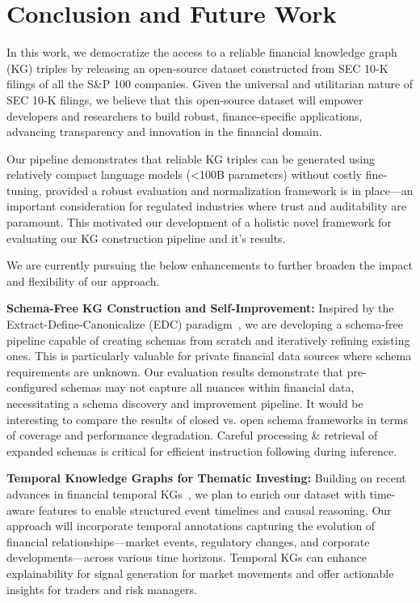 \section{Conclusion and Future Work}
In this work, we democratize the access to a reliable financial knowledge graph (KG) triples by releasing an open-source dataset constructed from SEC 10-K filings of all the S\&P 100 companies.
Given the universal and utilitarian nature of SEC 10-K filings, we believe that this open-source dataset will empower developers and researchers to build robust, finance-specific applications, advancing transparency and innovation in the financial domain. 

Our pipeline demonstrates that reliable KG triples can be generated using relatively compact language models (<100B parameters) without costly fine-tuning, provided a robust evaluation and normalization framework is in place—an important consideration for regulated industries where trust and auditability are paramount. This motivated our development of a holistic novel framework for evaluating our KG construction pipeline and it's results. 

We are currently pursuing the below enhancements to further broaden the impact and flexibility of our approach. 

\textbf{Schema-Free KG Construction and Self-Improvement:} Inspired by the Extract-Define-Canonicalize (EDC) paradigm~\cite{zhang2024extract}, we are developing a schema-free pipeline capable of creating schemas from scratch and iteratively refining existing ones. This is particularly valuable for private financial data sources where schema requirements are unknown. Our evaluation results demonstrate that pre-configured schemas may not capture all nuances within financial data, necessitating a schema discovery and improvement pipeline. It would be interesting to compare the results of closed vs. open schema frameworks in terms of coverage and performance degradation. Careful processing \& retrieval of expanded schemas is critical for efficient instruction following during inference.

\textbf{Temporal Knowledge Graphs for Thematic Investing:} Building on recent advances in financial temporal KGs~\cite{li2024findkg}, we plan to enrich our dataset with time-aware features to enable structured event timelines and causal reasoning. Our approach will incorporate temporal annotations capturing the evolution of financial relationships—market events, regulatory changes, and corporate developments—across various time horizons. Temporal KGs can enhance explainability for signal generation for market movements and offer actionable insights for traders and risk managers.

